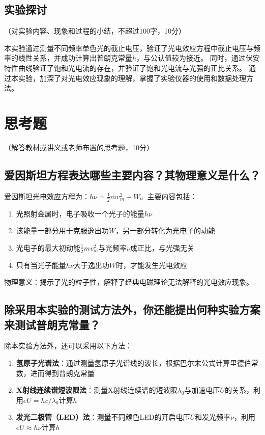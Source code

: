 \documentclass[10pt,a4paper]{ctexart}
\newcommand{\xiaosi}{\fontsize{12pt}{16pt}\selectfont}
\begin{document}
    \subsection{实验探讨}
    \xiaosi （对实验内容、现象和过程的小结，不超过100字，10分）

本实验通过测量不同频率单色光的截止电压，验证了光电效应方程中截止电压与频率的线性关系，并成功计算出普朗克常量$h$，与公认值较为接近。
同时，通过伏安特性曲线验证了饱和光电流的存在，并验证了饱和光电流与光强的正比关系。
通过本实验，加深了对光电效应现象的理解，掌握了实验仪器的使用和数据处理方法。
\section{思考题}

    \xiaosi （解答教材或讲义或老师布置的思考题，10分）

    \subsection{爱因斯坦方程表达哪些主要内容？其物理意义是什么？}

    爱因斯坦光电效应方程为：$h\nu = \frac{1}{2}mv_m^2 + W$。主要内容包括：
    
\begin{enumerate}
        \item 光照射金属时，电子吸收一个光子的能量$h\nu$
        \item 该能量一部分用于克服逸出功$W$，另一部分转化为光电子的动能
        \item 光电子的最大初动能$\frac{1}{2}mv_m^2$与光频率$\nu$成正比，与光强无关
        \item 只有当光子能量$h\nu$大于逸出功$W$时，才能发生光电效应
    \end{enumerate}
    物理意义：揭示了光的粒子性，解释了经典电磁理论无法解释的光电效应现象。

    \subsection{除采用本实验的测试方法外，你还能提出何种实验方案来测试普朗克常量？}
  除本实验方法外，还可以采用以下方法：
    
\begin{enumerate}
        \item \textbf{氢原子光谱法}：通过测量氢原子光谱线的波长，根据巴尔末公式计算里德伯常数，进而得到普朗克常量
        \item \textbf{X射线连续谱短波限法}：测量X射线连续谱的短波限$\lambda_0$与加速电压$U$的关系，利用$eU = h c / \lambda_0$计算$h$
        \item \textbf{发光二极管（LED）法}：测量不同颜色LED的开启电压$U$和发光频率$\nu$，利用$eU \approx h\nu$计算$h$
    \end{enumerate}
\end{document}
